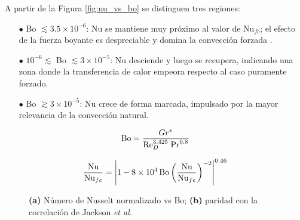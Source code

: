 A partir de la Figura \ref{fig:nu_vs_bo} se distinguen tres regiones:

\begin{itemize}
  \item[$\bullet$] Bo $\lesssim 3\text{.}5 \times 10^{-6}$: Nu se mantiene muy próximo al valor de Nu$_{fc}$; el efecto de la fuerza boyante es despreciable y domina la convección forzada  \cite{li2021development}.
  \item[$\bullet$] $10^{-6} \lesssim$ Bo $\lesssim 3 \times 10^{-5}$: Nu desciende y luego se recupera, indicando una zona donde la transferencia de calor empeora respecto al caso puramente forzado.
  \item[$\bullet$] Bo $\gtrsim 3 \times 10^{-5}$: Nu crece de forma marcada, impulsado por la mayor relevancia de la convección natural.
\end{itemize}

\begin{equation}
\text{Bo}= \frac{Gr^*}{\text{Re}_D^{3.425} \hspace*{1mm} \text{Pr}^{0.8}}
\label{eq:jackson_bo}
\end{equation}

\begin{equation}
\frac{\text{Nu}}{\text{Nu}_{fc}} =
\left\vert 1 - 8 \times 10^4 \hspace*{0.5mm} \text{Bo}
\left( \frac{\text{Nu}}{\text{Nu}_{fc}} \right)^{-2} \right\vert^{0.46}
\label{eq:jackson_corr}
\end{equation}

\begin{figure}[H]
  \centering
  \caption{\textbf{(a)} Número de Nusselt normalizado vs Bo; \textbf{(b)} paridad con la correlación de Jackson \textit{et al.}}
  \label{fig:nusselt}
\end{figure}

